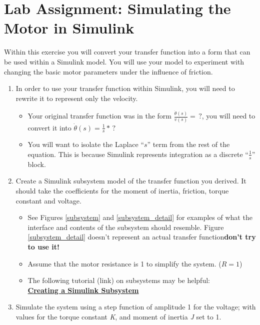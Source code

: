 \documentclass[openany,11pt,fleqn]{book} %
\begin{document}
%	

\section{\color{blue}Lab Assignment: Simulating the Motor in Simulink}
\begin{exercise}
	Within this exercise you will convert your transfer function into a form that can be used within a Simulink model. You will use your model to experiment with changing the basic motor parameters under the influence of friction.

	\begin{enumerate}
	    \item In order to use your transfer function within Simulink, you will need to rewrite it to represent only the velocity. 
	    \begin{itemize}
	        \item Your original transfer function was in the form $\frac{\dot{\theta}(s)}{v(s)} = \,?$, you will need to convert it into $\dot{\theta}(s) = \frac{1}{s}*\,?$
	        \item You will want to isolate the Laplace ``$s$'' term from the rest of the equation. This is because Simulink represents integration as a discrete ``$\frac{1}{s}$'' block. 
	    \end{itemize}
	    \item Create a Simulink subsystem model of the transfer function you derived. It should take the coefficients for the moment of inertia, friction, torque constant and voltage.
	    \begin{itemize}
	        \item See Figures \ref{subsystem} and \ref{subsystem_detail} for examples of what the interface and contents of the subsystem should resemble. Figure \ref{subsystem_detail} doesn't represent an actual transfer function\textemdash \textbf{don't try to use it!}
	        \item Assume that the motor resistance is 1 to simplify the system. ($R=1$)
	        \item The following tutorial (link) on subsystems may be helpful:\\ \href{http://www.mathworks.com/help/simulink/ug/creating-subsystems.html}{\textbf{Creating a Simulink Subsystem}}
	     \end{itemize}
	    \item Simulate the system using a step function of amplitude 1 for the voltage; with values for the torque constant \textit{K}, and moment of inertia \textit{J} set to 1. 

\end{enumerate}
\end{exercise}
\end{document}

